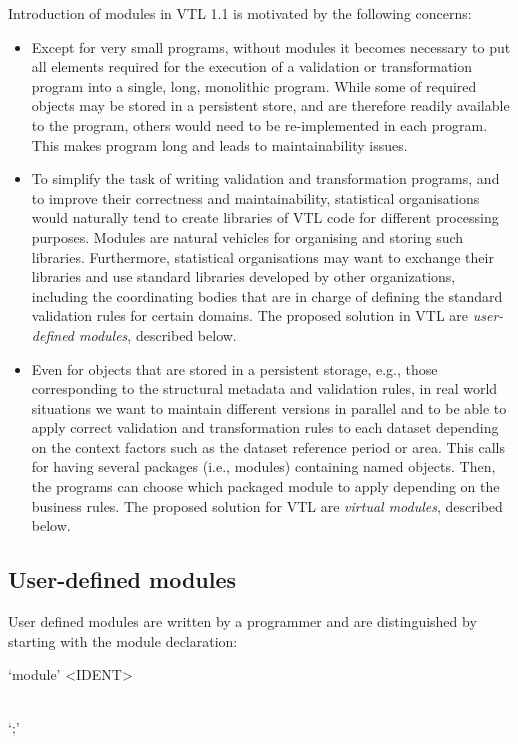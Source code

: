 \documentclass[droidmono,libertine,twoside,user,unofficial]{ecarticle}
\newcommand{\optSemiCol}{\begin{stack}\\`;'\end{stack}}
\begin{document}
Introduction of modules in VTL 1.1 is motivated by the following
concerns:
\begin{itemize}
\item Except for very small programs, without modules it becomes
  necessary to put all elements required for the execution of a
  validation or transformation program into a single, long, monolithic
  program.  While some of required objects may be stored in a
  persistent store, and are therefore readily available to the
  program, others would need to be re-implemented in each program.
  This makes program long and leads to maintainability issues.

\item To simplify the task of writing validation and transformation
  programs, and to improve their correctness and maintainability,
  statistical organisations would naturally tend to create libraries
  of VTL code for different processing purposes.  Modules are natural
  vehicles for organising and storing such libraries.  Furthermore,
  statistical organisations may want to exchange their libraries and
  use standard libraries developed by other organizations, including
  the coordinating bodies that are in charge of defining the standard
  validation rules for certain domains. The proposed solution in VTL
  are \emph{user-defined modules}, described below.
  
\item Even for objects that are stored in a persistent storage, e.g.,
  those corresponding to the structural metadata and validation rules,
  in real world situations we want to maintain different versions in
  parallel and to be able to apply correct validation and
  transformation rules to each dataset depending on the context
  factors such as the dataset reference period or area.  This calls
  for having several packages (i.e., modules) containing named
  objects.  Then, the programs can choose which packaged module to
  apply depending on the business rules.  The proposed solution for
  VTL are \emph{virtual modules}, described below.
\end{itemize}

\subsection{User-defined modules}
\label{sec:user-defined-modules}

User defined modules are written by a programmer and are distinguished
by starting with the module declaration:
\begin{syntdiag}
  `module' <IDENT> \optSemiCol
\end{syntdiag}
\end{document}
